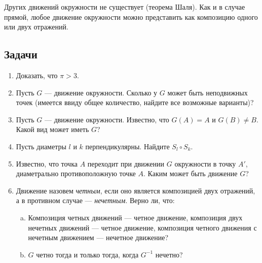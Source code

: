 Других движений окружности не существует (теорема Шаля). Как и в случае прямой, любое движение окружности можно представить как композицию одного или двух отражений.

\subsection*{Задачи}

\begin{enumerate}
\item Доказать, что $\pi>3$.
\item Пусть $G$ --- движение окружности. Сколько у $G$ может быть неподвижных точек (имеется ввиду общее количество, найдите все возможные варианты)?
\item Пусть $G$ --- движение окружности. Известно, что $G(A)=A$ и $G(B)\ne B$. Какой вид может иметь $G$?
\item Пусть диаметры $l$ и $k$ перпендикулярны. Найдите $S_l\circ S_k$.
\item Известно, что точка $A$ переходит при движении $G$ окружности в точку $A'$, диаметрально противоположную точке $A$. Каким может быть движение $G$?
\item Движение назовем \textit{четным}, если оно является композицией двух отражений, а в противном случае --- \textit{нечетным}. Верно ли, что:
\begin{enumerate}[a)]
\item Композиция четных движений --- четное движение, композиция двух нечетных движений --- четное движение, композиция четного движения с нечетным движением --- нечетное движение?
\item $G$ четно тогда и только тогда, когда $G^{-1}$ нечетно?
\end{enumerate}
\end{enumerate}

